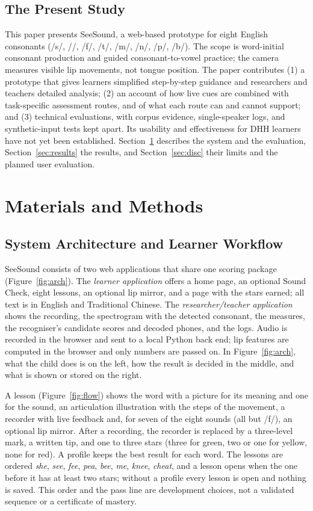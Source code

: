 \documentclass[engproc,article,submit,moreauthors]{Definitions/mdpi}
\newcommand{\ipa}[1]{/#1/}
\begin{document}
\subsection{The Present Study}
This paper presents SeeSound, a web-based prototype for eight English consonants (\ipa{s}, \ipa{\textesh}, \ipa{f}, \ipa{t\textesh}, \ipa{m}, \ipa{n}, \ipa{p}, \ipa{b}). The scope is word-initial consonant production and guided consonant-to-vowel practice; the camera measures visible lip movements, not tongue position. The paper contributes (1) a prototype that gives learners simplified step-by-step guidance and researchers and teachers detailed analysis; (2) an account of how live cues are combined with task-specific assessment routes, and of what each route can and cannot support; and (3) technical evaluations, with corpus evidence, single-speaker logs, and synthetic-input tests kept apart. Its usability and effectiveness for DHH learners have not yet been established. Section~\ref{sec:methods} describes the system and the evaluation, Section~\ref{sec:results} the results, and Section~\ref{sec:disc} their limits and the planned user evaluation.

\section{Materials and Methods}\label{sec:methods}
\subsection{System Architecture and Learner Workflow}
SeeSound consists of two web applications that share one scoring package (Figure~\ref{fig:arch}). The \emph{learner application} offers a home page, an optional Sound Check, eight lessons, an optional lip mirror, and a page with the stars earned; all text is in English and Traditional Chinese. The \emph{researcher/teacher application} shows the recording, the spectrogram with the detected consonant, the measures, the recogniser's candidate scores and decoded phones, and the logs. Audio is recorded in the browser and sent to a local Python back end; lip features are computed in the browser and only numbers are passed on. In Figure~\ref{fig:arch}, what the child does is on the left, how the result is decided in the middle, and what is shown or stored on the right.


A lesson (Figure~\ref{fig:flow}) shows the word with a picture for its meaning and one for the sound, an articulation illustration with the steps of the movement, a recorder with live feedback and, for seven of the eight sounds (all but \ipa{f}), an optional lip mirror. After a recording, the recorder is replaced by a three-level mark, a written tip, and one to three stars (three for green, two or one for yellow, none for red). A profile keeps the best result for each word. The lessons are ordered \textit{she}, \textit{see}, \textit{fee}, \textit{pea}, \textit{bee}, \textit{me}, \textit{knee}, \textit{cheat}, and a lesson opens when the one before it has at least two stars; without a profile every lesson is open and nothing is saved. This order and the pass line are development choices, not a validated sequence or a certificate of mastery.
\end{document}
